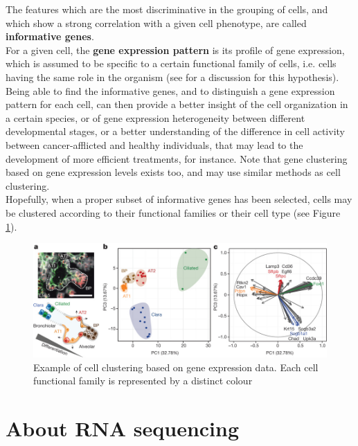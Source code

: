 \documentclass{report}
\begin{document}
The features which are the most discriminative in the grouping of cells, and which show a strong correlation with a given cell phenotype, are called \textbf{informative genes}\cite{liu2006efficient}.\\

For a given cell, the \textbf{gene expression pattern} is its profile of gene expression, which is assumed to be specific to a certain functional family of cells, i.e. cells having the same role in the organism (see \cite{barash2002context} for a discussion for this hypothesis).\\

Being able to find the informative genes, and to distinguish a gene expression pattern for each cell, can then provide a better insight of the cell organization in a certain species\cite{tintori2016transcriptional}, or of gene expression heterogeneity between different developmental stages\cite{goolam2016heterogeneity}, or a better understanding of the difference in cell activity between cancer-afflicted and healthy individuals\cite{ting2014single}, that may lead to the development of more efficient treatments, for instance.  Note that gene clustering based on gene expression levels exists too, and may use similar methods as cell clustering\cite{d2005does}\cite{jiang2004cluster}.\\

Hopefully, when a proper subset of informative genes has been selected, cells may be clustered according to their functional families or their cell type (see Figure \ref{cellclustering}). 

\begin{figure}[H]
\centering
\includegraphics[scale=0.45]{illustrations/cellclustering.jpg}
\caption{Example of cell clustering based on gene expression data. Each cell functional family is represented by a distinct colour}
\label{cellclustering}
\end{figure}

\section{About RNA sequencing}
\end{document}
